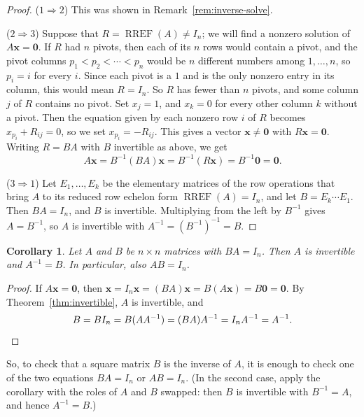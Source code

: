 \documentclass[11pt]{article}
\theoremstyle{definition}
\theoremstyle{plain}
\newtheorem{corollary}[definition]{Corollary}
\theoremstyle{remark}
\DeclareMathOperator{\RREF}{RREF}
\begin{document}
\begin{proof}
    ($1 \Rightarrow 2$) This was shown in Remark~\ref{rem:inverse-solve}.

    ($2 \Rightarrow 3$) Suppose that $R = \RREF(A) \neq I_n$; we will find a nonzero solution of $A\mathbf{x} = \mathbf{0}$. If $R$ had $n$ pivots, then each of its $n$ rows would contain a pivot, and the pivot columns $p_1 < p_2 < \cdots < p_n$ would be $n$ different numbers among $1, \ldots, n$, so $p_i = i$ for every $i$. Since each pivot is a $1$ and is the only nonzero entry in its column, this would mean $R = I_n$. So $R$ has fewer than $n$ pivots, and some column $j$ of $R$ contains no pivot. Set $x_j = 1$, and $x_k = 0$ for every other column $k$ without a pivot. Then the equation given by each nonzero row $i$ of $R$ becomes $x_{p_i} + R_{ij} = 0$, so we set $x_{p_i} = -R_{ij}$. This gives a vector $\mathbf{x} \neq \mathbf{0}$ with $R\mathbf{x} = \mathbf{0}$. Writing $R = BA$ with $B$ invertible as above, we get
    \[A\mathbf{x} = B^{-1}(BA)\mathbf{x} = B^{-1}(R\mathbf{x}) = B^{-1}\mathbf{0} = \mathbf{0}.\]

    ($3 \Rightarrow 1$) Let $E_1, \ldots, E_k$ be the elementary matrices of the row operations that bring $A$ to its reduced row echelon form $\RREF(A) = I_n$, and let $B = E_k \cdots E_1$. Then $BA = I_n$, and $B$ is invertible. Multiplying from the left by $B^{-1}$ gives $A = B^{-1}$, so $A$ is invertible with $A^{-1} = (B^{-1})^{-1} = B$.
\end{proof}

\begin{corollary}\label{cor:one-sided}
    Let $A$ and $B$ be $n \times n$ matrices with $BA = I_n$. Then $A$ is invertible and $A^{-1} = B$. In particular, also $AB = I_n$.
\end{corollary}

\begin{proof}
    If $A\mathbf{x} = \mathbf{0}$, then $\mathbf{x} = I_n \mathbf{x} = (BA)\mathbf{x} = B(A\mathbf{x}) = B\mathbf{0} = \mathbf{0}$. By Theorem~\ref{thm:invertible}, $A$ is invertible, and
    \[B = B I_n = B(AA^{-1}) = (BA)A^{-1} = I_n A^{-1} = A^{-1}. \qedhere\]
\end{proof}

So, to check that a square matrix $B$ is the inverse of $A$, it is enough to check one of the two equations $BA = I_n$ or $AB = I_n$. (In the second case, apply the corollary with the roles of $A$ and $B$ swapped: then $B$ is invertible with $B^{-1} = A$, and hence $A^{-1} = B$.)
\end{document}
